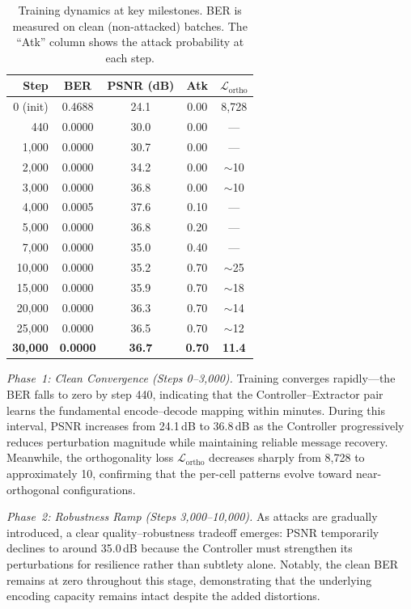 \documentclass[conference]{IEEEtran}
\newcommand{\Lcal}{\mathcal{L}}
\begin{document}
\begin{table}[t]
\centering
\caption{Training dynamics at key milestones. BER is measured on clean (non-attacked) batches. The ``Atk'' column shows the attack probability at each step.}
\label{tab:training_dynamics}
\small
\begin{tabular}{@{}rcccc@{}}
\toprule
\textbf{Step} & \textbf{BER} & \textbf{PSNR (dB)} & \textbf{Atk} & \textbf{$\Lcal_\text{ortho}$} \\
\midrule
0 (init)     & 0.4688 & 24.1 & 0.00 & 8{,}728 \\
440          & 0.0000 & 30.0 & 0.00 & --- \\
1{,}000      & 0.0000 & 30.7 & 0.00 & --- \\
2{,}000      & 0.0000 & 34.2 & 0.00 & $\sim$10 \\
3{,}000      & 0.0000 & 36.8 & 0.00 & $\sim$10 \\
4{,}000      & 0.0005 & 37.6 & 0.10 & --- \\
5{,}000      & 0.0000 & 36.8 & 0.20 & --- \\
7{,}000      & 0.0000 & 35.0 & 0.40 & --- \\
10{,}000     & 0.0000 & 35.2 & 0.70 & $\sim$25 \\
15{,}000     & 0.0000 & 35.9 & 0.70 & $\sim$18 \\
20{,}000     & 0.0000 & 36.3 & 0.70 & $\sim$14 \\
25{,}000     & 0.0000 & 36.5 & 0.70 & $\sim$12 \\
\textbf{30{,}000}     & \textbf{0.0000} & \textbf{36.7} & \textbf{0.70} & \textbf{11.4} \\
\bottomrule
\end{tabular}
\end{table}

\textit{Phase~1: Clean Convergence (Steps 0--3{,}000).}
Training converges rapidly---the BER falls to zero by step 440, indicating that the Controller--Extractor pair learns the fundamental encode--decode mapping within minutes.
During this interval, PSNR increases from 24.1\,dB to 36.8\,dB as the Controller progressively reduces perturbation magnitude while maintaining reliable message recovery.
Meanwhile, the orthogonality loss $\Lcal_\text{ortho}$ decreases sharply from 8{,}728 to approximately 10, confirming that the per-cell patterns evolve toward near-orthogonal configurations.

\textit{Phase~2: Robustness Ramp (Steps 3{,}000--10{,}000).}
As attacks are gradually introduced, a clear quality--robustness tradeoff emerges: PSNR temporarily declines to around 35.0\,dB because the Controller must strengthen its perturbations for resilience rather than subtlety alone.
Notably, the clean BER remains at zero throughout this stage, demonstrating that the underlying encoding capacity remains intact despite the added distortions.
\end{document}
